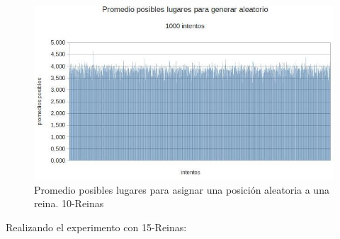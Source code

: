 \documentclass[a4paper,10pt]{article}
\begin{document}
\begin{itemize}
\begin{figure}
 \centering
 \includegraphics[scale=0.5]{posibles10.jpg}
 \caption{Promedio posibles lugares para asignar una posición aleatoria a una reina. 10-Reinas}
 \label{fig:posibles10}
\end{figure}

\end{itemize}

Realizando el experimento con 15-Reinas:
\end{document}
